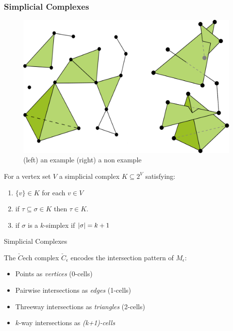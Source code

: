 \begin{frame}[fragile]
\frametitle{Simplicial Complexes}
\begin{figure}
\centering
  \includegraphics[width=.6\textwidth]{simplicial}
 \caption{(left) an example \phantom{2000}  (right) a non example}
\end{figure}
For a vertex set $V$ a simplicial complex $K \subseteq 2^V$ satisfying:
\begin{enumerate}
\item $\{ v \} \in K$ for each $v \in V$
\item if $\tau \subseteq \sigma \in K$  then $\tau \in K$. 
\item if $\sigma$ is a $k$-simplex if $|\sigma| = k+1$ 
\end{enumerate}
\end{frame}

\begin{frame}{Simplicial Complexes}
\centering
\begin{minipage}{0.45\columnwidth}%
\end{minipage}%
\begin{minipage}{0.55\columnwidth}%
The $\check{C}$ech complex $\check{C}_{\epsilon}$ encodes the intersection pattern
of $M_{\epsilon}$:
\begin{itemize}
\item<2->Points as \emph{vertices} (0-cells)
\item<3->Pairwise intersections as \emph{edges} (1-cells)
\item<4->Threeway intersections as \emph{triangles} (2-cells)
\item<5->$k$-way intersections as \emph{(k+1)-cells}
\end{itemize}
\end{minipage}
\end{frame}

